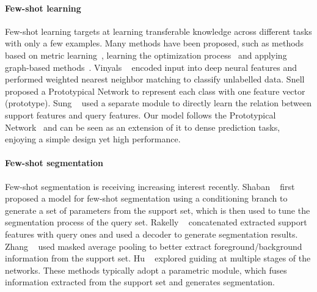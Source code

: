 \documentclass[10pt,twocolumn,letterpaper]{article}
\begin{document}
\vspace{-10pt}
\paragraph{Few-shot learning} Few-shot learning targets at learning transferable knowledge across different tasks with only a few examples. Many methods have been proposed, such as methods based on metric learning~\cite{vinyals2016matching, snell2017prototypical}, learning the optimization process~\cite{ravi2016optimization, finn2017model} and applying graph-based methods~\cite{garcia2018fewshot, liu2018learning}. Vinyals \etal~\cite{vinyals2016matching} encoded input into deep neural features and performed weighted nearest neighbor matching to classify unlabelled data. Snell \etal~\cite{snell2017prototypical} proposed a Prototypical Network to represent each class with one feature vector (prototype). Sung \etal~\cite{sung2018learning} used a separate module to directly learn the relation between support features and query features. Our model follows the Prototypical Network~\cite{snell2017prototypical} and can be seen as an extension of it to dense prediction tasks, enjoying a simple design yet high performance.

\vspace{-10pt}
\paragraph{Few-shot segmentation} 
Few-shot segmentation is receiving increasing interest recently. Shaban \etal~\cite{shaban2017one} first proposed a model for few-shot segmentation using a conditioning branch to generate a set of parameters  from the support set, which is then used to tune the segmentation process of the query set. Rakelly \etal~\cite{rakelly2018conditional} concatenated extracted support features with  query ones and used a decoder to generate segmentation results. Zhang \etal~\cite{zhang2018sg} used masked average
pooling to better extract foreground/background information from the support set. Hu \etal~\cite{Hu2018AttentionbasedMG} explored guiding at multiple stages of the networks. These methods typically adopt a parametric module, which fuses information extracted from the support set and generates segmentation. 
\end{document}
